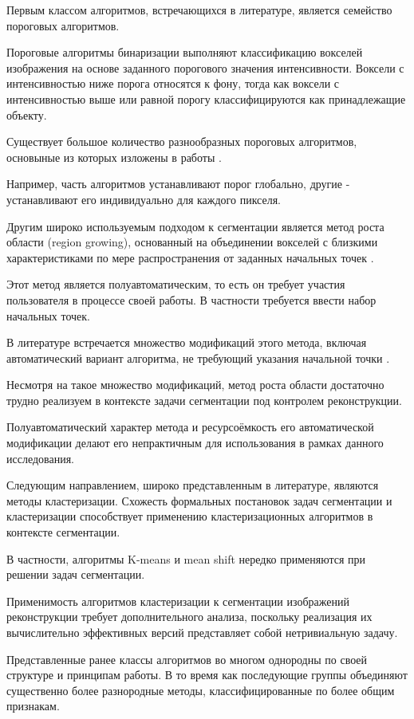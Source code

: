 Первым классом алгоритмов, встречающихся в литературе, является семейство пороговых алгоритмов. 

Пороговые алгоритмы бинаризации выполняют классификацию вокселей изображения на основе заданного порогового значения интенсивности. Воксели с интенсивностью ниже порога относятся к фону, тогда как воксели с интенсивностью выше или равной порогу классифицируются как принадлежащие объекту.

Существует большое количество разнообразных пороговых алгоритмов, основыные из которых изложены в работы \cite{wirjadi2007survey}. 

Например, часть алгоритмов устанавливают порог глобально, другие - устанавливают его индивидуально для каждого пикселя. 

Другим широко используемым подходом к сегментации является метод роста области (region growing), основанный на объединении вокселей с близкими характеристиками по мере распространения от заданных начальных точек \cite{adams1994seeded}.

Этот метод является полуавтоматическим, то есть он требует участия пользователя в процессе своей работы. В частности требуется ввести набор начальных точек.

В литературе встречается множество модификаций этого метода, включая автоматический вариант алгоритма, не требующий указания начальной точки \cite{lin2000unseeded}. 

Несмотря на такое множество модификаций, метод роста области достаточно трудно реализуем в контексте задачи сегментации под контролем реконструкции.

Полуавтоматический характер метода и ресурсоёмкость его автоматической модификации делают его непрактичным для использования в рамках данного исследования.

Следующим направлением, широко представленным в литературе, являются методы кластеризации. Схожесть формальных постановок задач сегментации и кластеризации способствует применению кластеризационных алгоритмов в контексте сегментации.

В частности, алгоритмы K-means \cite{sarker2017segmentation} и mean shift \cite{comaniciu2002mean} нередко применяются при решении задач сегментации.

Применимость алгоритмов кластеризации к сегментации изображений реконструкции требует дополнительного анализа, поскольку реализация их вычислительно эффективных версий представляет собой нетривиальную задачу.

Представленные ранее классы алгоритмов во многом однородны по своей структуре и принципам работы. В то время как последующие группы объединяют существенно более разнородные методы, классифицированные по более общим признакам.

